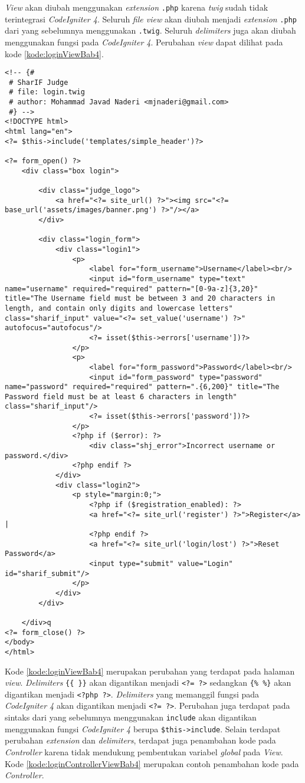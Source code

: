 \textit{View} akan diubah menggunakan \textit{extension} \texttt{.php} karena \textit{twig} sudah tidak terintegrasi \textit{CodeIgniter 4}. Seluruh \textit{file view} akan diubah menjadi \textit{extension} \texttt{.php} dari yang sebelumnya menggunakan \texttt{.twig}. Seluruh \textit{delimiters} juga akan diubah menggunakan fungsi pada \textit{CodeIgniter 4}. Perubahan \textit{view} dapat dilihat pada kode \ref{kode:loginViewBab4}.

\begin{lstlisting}[caption=Perubahan \textit{view} pada \textit{Login.php}, label=kode:loginViewBab4]
<!-- {#
 # SharIF Judge
 # file: login.twig
 # author: Mohammad Javad Naderi <mjnaderi@gmail.com>
 #} -->
<!DOCTYPE html>
<html lang="en">
<?= $this->include('templates/simple_header')?>

<?= form_open() ?>
	<div class="box login">

		<div class="judge_logo">
			<a href="<?= site_url() ?>"><img src="<?= base_url('assets/images/banner.png') ?>"/></a>
		</div>

		<div class="login_form">
			<div class="login1">
				<p>
					<label for="form_username">Username</label><br/>
					<input id="form_username" type="text" name="username" required="required" pattern="[0-9a-z]{3,20}" title="The Username field must be between 3 and 20 characters in length, and contain only digits and lowercase letters" class="sharif_input" value="<?= set_value('username') ?>" autofocus="autofocus"/>
					<?= isset($this->errors['username'])?>
				</p>
				<p>
					<label for="form_password">Password</label><br/>
					<input id="form_password" type="password" name="password" required="required" pattern=".{6,200}" title="The Password field must be at least 6 characters in length" class="sharif_input"/>
					<?= isset($this->errors['password'])?>
				</p>
				<?php if ($error): ?>
					<div class="shj_error">Incorrect username or password.</div>
				<?php endif ?>
			</div>
			<div class="login2">
				<p style="margin:0;">
					<?php if ($registration_enabled): ?>
					<a href="<?= site_url('register') ?>">Register</a> |
					<?php endif ?>
					<a href="<?= site_url('login/lost') ?>">Reset Password</a>
					<input type="submit" value="Login" id="sharif_submit"/>
				</p>
			</div>
		</div>

	</div>q
<?= form_close() ?>
</body>
</html>
\end{lstlisting}

Kode \ref{kode:loginViewBab4} merupakan perubahan yang terdapat pada halaman \textit{view}. \textit{Delimiters} \verb|{{ }}| akan digantikan menjadi \texttt{<?= ?>} sedangkan \verb|{% %}| akan digantikan menjadi \texttt{<?php ?>}. \textit{Delimiters} yang memanggil fungsi pada \textit{CodeIgniter 4} akan digantikan menjadi \texttt{<?= ?>}. Perubahan juga terdapat pada sintaks dari yang sebelumnya menggunakan \texttt{include} akan digantikan menggunakan fungsi \textit{CodeIgniter 4} berupa \verb|$this->include|. Selain terdapat perubahan \textit{extension} dan \textit{delimiters}, terdapat juga penambahan kode pada \textit{Controller} karena tidak mendukung pembentukan variabel \textit{global} pada \textit{View}. Kode \ref{kode:loginControllerViewBab4} merupakan contoh penambahan kode pada \textit{Controller}.

